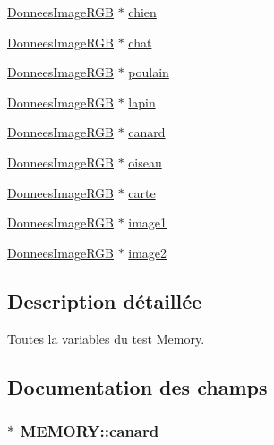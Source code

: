 \begin{DoxyCompactItemize}
\hyperlink{struct_donnees_image_r_g_b}{Donnees\+Image\+R\+GB} $\ast$ \hyperlink{struct_m_e_m_o_r_y_ae2a24932d95d3471ca22312607e9c8ea}{chien}
\item 
\hyperlink{struct_donnees_image_r_g_b}{Donnees\+Image\+R\+GB} $\ast$ \hyperlink{struct_m_e_m_o_r_y_aafcf74c8369143ffe284e83c295e0fa6}{chat}
\item 
\hyperlink{struct_donnees_image_r_g_b}{Donnees\+Image\+R\+GB} $\ast$ \hyperlink{struct_m_e_m_o_r_y_a572b438e4f8957f895af92c519854545}{poulain}
\item 
\hyperlink{struct_donnees_image_r_g_b}{Donnees\+Image\+R\+GB} $\ast$ \hyperlink{struct_m_e_m_o_r_y_a84938c5ea87d14e0940633961e8eb23a}{lapin}
\item 
\hyperlink{struct_donnees_image_r_g_b}{Donnees\+Image\+R\+GB} $\ast$ \hyperlink{struct_m_e_m_o_r_y_a02eed805b98956fcfea73356a6f63550}{canard}
\item 
\hyperlink{struct_donnees_image_r_g_b}{Donnees\+Image\+R\+GB} $\ast$ \hyperlink{struct_m_e_m_o_r_y_a853ccda79bf8cf059379233d9c232a94}{oiseau}
\item 
\hyperlink{struct_donnees_image_r_g_b}{Donnees\+Image\+R\+GB} $\ast$ \hyperlink{struct_m_e_m_o_r_y_a39611f9b9e8dbbb311fb449f92442f49}{carte}
\item 
\hyperlink{struct_donnees_image_r_g_b}{Donnees\+Image\+R\+GB} $\ast$ \hyperlink{struct_m_e_m_o_r_y_a263aa21ffb4551879e1307457f535331}{image1}
\item 
\hyperlink{struct_donnees_image_r_g_b}{Donnees\+Image\+R\+GB} $\ast$ \hyperlink{struct_m_e_m_o_r_y_a353796df027997b4cfdeb121828fd1b6}{image2}
\end{DoxyCompactItemize}


\subsection{Description détaillée}
Toutes la variables du test Memory. 

\subsection{Documentation des champs}
\subsubsection[{\texorpdfstring{canard}{canard}}]{$\ast$ M\+E\+M\+O\+R\+Y\+::canard}\hypertarget{struct_m_e_m_o_r_y_a02eed805b98956fcfea73356a6f63550}{}\label{struct_m_e_m_o_r_y_a02eed805b98956fcfea73356a6f63550}
